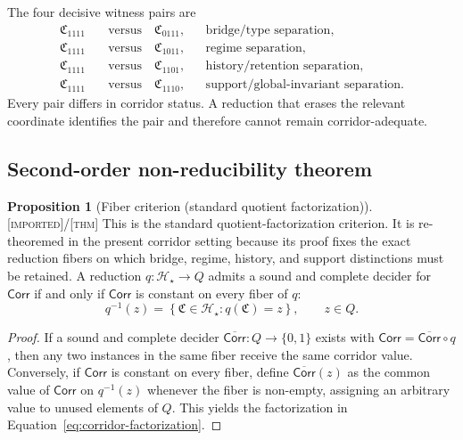 \documentclass[11pt]{article}
\newcommand{\Thm}{\textsc{[thm]}}
\newcommand{\Imp}{\textsc{[imported]}}
\theoremstyle{definition}
\newtheorem{sproposition}{Proposition}
\begin{document}
The four decisive witness pairs are
\begin{align}
\mathfrak C_{1111}&\quad\text{versus}\quad\mathfrak C_{0111},
&&\text{bridge/type separation},
\label{eq:bridge-witness-pair}
\\
\mathfrak C_{1111}&\quad\text{versus}\quad\mathfrak C_{1011},
&&\text{regime separation},
\label{eq:regime-witness-pair}
\\
\mathfrak C_{1111}&\quad\text{versus}\quad\mathfrak C_{1101},
&&\text{history/retention separation},
\label{eq:history-witness-pair}
\\
\mathfrak C_{1111}&\quad\text{versus}\quad\mathfrak C_{1110},
&&\text{support/global-invariant separation}.
\label{eq:support-witness-pair}
\end{align}
Every pair differs in corridor status. A reduction that erases the relevant
coordinate identifies the pair and therefore cannot remain corridor-adequate.

\subsection{Second-order non-reducibility theorem}
\label{supp:nonreducibility}

\begin{sproposition}[Fiber criterion (standard quotient factorization)]
\label{prop:fiber-criterion}
\Imp{}/\Thm{} This is the standard quotient-factorization criterion.
It is re-theoremed in the present corridor setting because its proof fixes the
exact reduction fibers on which bridge, regime, history, and support distinctions
must be retained. A reduction $q:\mathcal H_\star\to Q$ admits a sound and
complete decider for $\mathsf{Corr}$ if and only if $\mathsf{Corr}$ is constant on
every fiber of $q$:
\begin{equation}
q^{-1}(z)=\left\{\mathfrak C\in\mathcal H_\star:q(\mathfrak C)=z\right\},
\qquad z\in Q.
\label{eq:reduction-fibers}
\end{equation}
\end{sproposition}

\begin{proof}
If a sound and complete decider
$\overline{\mathsf{Corr}}:Q\to\{0,1\}$ exists with
$\mathsf{Corr}=\overline{\mathsf{Corr}}\circ q$, then any two instances in the
same fiber receive the same corridor value. Conversely, if $\mathsf{Corr}$ is
constant on every fiber, define $\overline{\mathsf{Corr}}(z)$ as the common value
of $\mathsf{Corr}$ on $q^{-1}(z)$ whenever the fiber is non-empty, assigning an
arbitrary value to unused elements of $Q$. This yields the factorization in
Equation~\eqref{eq:corridor-factorization}.
\end{proof}
\end{document}
